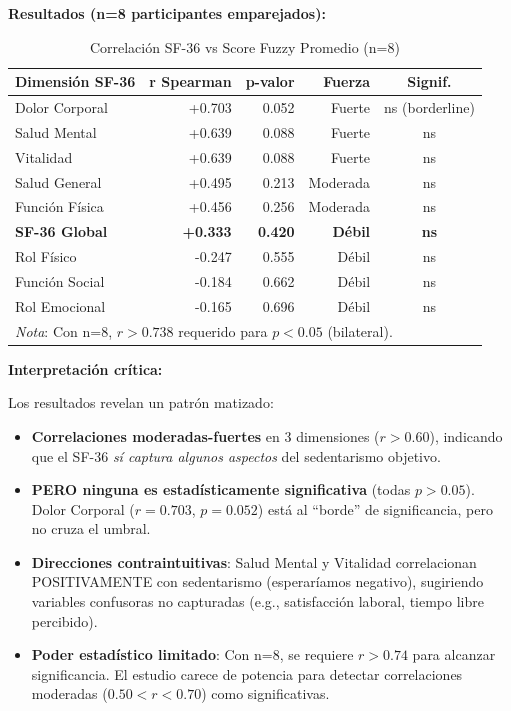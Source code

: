 \documentclass[12pt,letterpaper,twoside]{report}
\begin{document}
\begin{calculobox}
\textbf{Resultados (n=8 participantes emparejados):}

\begin{table}[H]
\centering
\caption{Correlación SF-36 vs Score Fuzzy Promedio (n=8)}
\label{tab:sf36_fuzzy_n8}
\begin{tabular}{@{}lrrrc@{}}
\toprule
\textbf{Dimensión SF-36} & \textbf{r Spearman} & \textbf{p-valor} & \textbf{Fuerza} & \textbf{Signif.} \\
\midrule
Dolor Corporal      & +0.703 & 0.052 & Fuerte         & ns (borderline) \\
Salud Mental        & +0.639 & 0.088 & Fuerte         & ns \\
Vitalidad           & +0.639 & 0.088 & Fuerte         & ns \\
Salud General       & +0.495 & 0.213 & Moderada       & ns \\
Función Física      & +0.456 & 0.256 & Moderada       & ns \\
\textbf{SF-36 Global} & \textbf{+0.333} & \textbf{0.420} & \textbf{Débil} & \textbf{ns} \\
Rol Físico          & -0.247 & 0.555 & Débil          & ns \\
Función Social      & -0.184 & 0.662 & Débil          & ns \\
Rol Emocional       & -0.165 & 0.696 & Débil          & ns \\
\bottomrule
\multicolumn{5}{l}{\footnotesize \textit{Nota}: Con n=8, $r > 0.738$ requerido para $p < 0.05$ (bilateral).}
\end{tabular}
\end{table}
\end{calculobox}

\begin{decisionbox}
\textbf{Interpretación crítica:}

Los resultados revelan un patrón matizado:
\begin{itemize}[noitemsep]
    \item \textbf{Correlaciones moderadas-fuertes} en 3 dimensiones ($r > 0.60$), indicando que el SF-36 \textit{sí captura algunos aspectos} del sedentarismo objetivo.
    
    \item \textbf{PERO ninguna es estadísticamente significativa} (todas $p > 0.05$). Dolor Corporal ($r=0.703$, $p=0.052$) está al ``borde'' de significancia, pero no cruza el umbral.
    
    \item \textbf{Direcciones contraintuitivas}: Salud Mental y Vitalidad correlacionan POSITIVAMENTE con sedentarismo (esperaríamos negativo), sugiriendo variables confusoras no capturadas (e.g., satisfacción laboral, tiempo libre percibido).
    
    \item \textbf{Poder estadístico limitado}: Con n=8, se requiere $r > 0.74$ para alcanzar significancia. El estudio carece de potencia para detectar correlaciones moderadas ($0.50 < r < 0.70$) como significativas.
\end{itemize}
\end{decisionbox}
\end{document}
